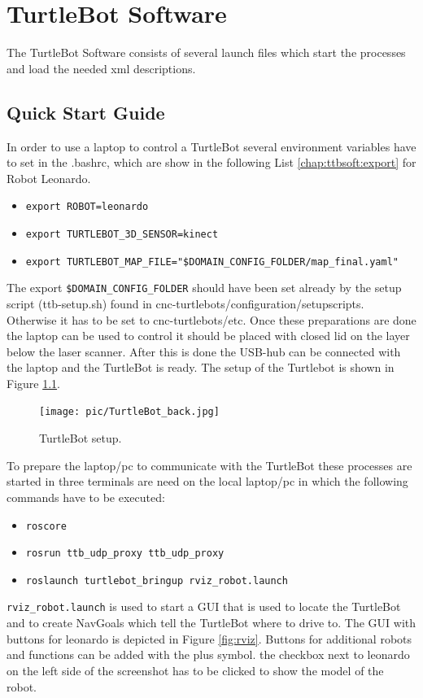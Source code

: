 \chapter{TurtleBot Software}
\label{chap:TurtleBotSoftware}
The TurtleBot Software consists of several launch files which start the processes and load the needed xml descriptions.

\section{Quick Start Guide}
In order to use a laptop to control a TurtleBot several environment variables have to set in the .bashrc, which are show in the following List \ref{chap:ttbsoft:export} for Robot Leonardo.
\begin{itemize}
	\item \verb#export ROBOT=leonardo#
	\item \verb#export TURTLEBOT_3D_SENSOR=kinect#
	\item \verb#export TURTLEBOT_MAP_FILE="$DOMAIN_CONFIG_FOLDER/map_final.yaml"#
	\label{chap:ttbsoft:export}
\end{itemize}
The export \verb#$DOMAIN_CONFIG_FOLDER# should have been set already by the setup script (ttb-setup.sh) found in cnc-turtlebots/configuration/setupscripts.
Otherwise it has to be set to cnc-turtlebots/etc. 
Once these preparations are done the laptop can be used to control it should be placed with closed lid on the layer below the laser scanner. After this is done the USB-hub can be connected with the laptop and the TurtleBot is ready. The setup of the Turtlebot is shown in Figure \ref{fig:ttbback}.
\begin{figure}[htbp]
	\centering
	\texttt{[image: pic/TurtleBot\_back.jpg]}
	\caption{TurtleBot setup.}
	\label{fig:ttbback}
\end{figure}
To prepare the laptop/pc to communicate with the TurtleBot these processes are started in three terminals are need on the local laptop/pc in which the following commands have to be executed:
\begin{itemize}
	\item \verb#roscore#
	\item \verb#rosrun ttb_udp_proxy ttb_udp_proxy#
	\item \verb#roslaunch turtlebot_bringup rviz_robot.launch#
\end{itemize}
\verb#rviz_robot.launch# is used to start a GUI that is used to locate the TurtleBot and to create NavGoals which tell the TurtleBot where to drive to. The GUI with buttons for leonardo is depicted in Figure \ref{fig:rviz}. Buttons for additional robots and functions can be added with the plus symbol. the checkbox next to leonardo on the left side of the screenshot has to be clicked to show the model of the robot.
